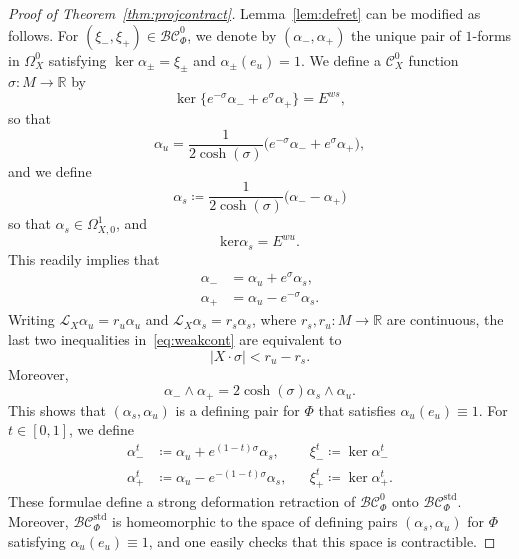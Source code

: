 \documentclass[letterpaper, 11pt]{article}
\numberwithin{equation}{section}
\newcommand{\R}{\mathbb{R}}
\begin{document}
\begin{proof}[Proof of Theorem~\ref{thm:projcontract}]
Lemma~\ref{lem:defret} can be modified as follows. For $(\xi_-, \xi_+) \in \mathcal{BC}^0_\Phi$, we denote by $(\alpha_-, \alpha_+)$ the unique pair of $1$-forms in $\Omega^0_X$ satisfying $\ker \alpha_\pm = \xi_\pm$ and $\alpha_\pm(e_u) = 1$. We define a $\mathcal{C}^0_X$ function $\sigma : M \rightarrow \R$ by $$\ker\big\{e^{-\sigma} \alpha_- + e^{\sigma} \alpha_+ \big\} = E^{ws},$$  so that $$\alpha_u = \frac{1}{2 \cosh(\sigma)}\big( e^{-\sigma} \alpha_- + e^{\sigma} \alpha_+\big),$$ and we define $$\alpha_s \coloneqq \frac{1}{2 \cosh(\sigma)} \big(\alpha_- - \alpha_+ \big)$$ so that $\alpha_s \in \Omega^1_{X,0}$, and $$\mathrm{ker} \alpha_s = E^{wu}.$$ This readily implies that 
\begin{align*}
\alpha_- &= \alpha_u + e^{\sigma} \alpha_s, \\
\alpha_+ &= \alpha_u - e^{-\sigma} \alpha_s.
\end{align*}
Writing $\mathcal{L}_X \alpha_u = r_u \alpha_u$ and $\mathcal{L}_X \alpha_s = r_s \alpha_s$, where $r_s, r_u : M \rightarrow \R$ are continuous, the last two inequalities in~\eqref{eq:weakcont} are equivalent to $$\vert X \cdot \sigma \vert < r_u - r_s.$$ Moreover, $$\alpha_- \wedge \alpha_+ = 2 \cosh(\sigma) \alpha_s \wedge \alpha_u.$$ This shows that $(\alpha_s, \alpha_u)$ is a defining pair for $\Phi$ that satisfies $\alpha_u(e_u) \equiv 1$. For $t \in [0,1]$, we define
\begin{align*}
\alpha^t_- &\coloneqq \alpha_u + e^{(1-t) \sigma} \alpha_s, & &\xi^t_- \coloneqq \ker \alpha^t_-\\
\alpha^t_+ &\coloneqq \alpha_u - e^{-(1-t) \sigma} \alpha_s, & & \xi^t_+ \coloneqq \ker \alpha^t_+.
\end{align*}
These formulae define a strong deformation retraction of $\mathcal{BC}^0_\Phi$ onto $\mathcal{BC}^\mathrm{std}_\Phi$. Moreover, $\mathcal{BC}^\mathrm{std}_\Phi$ is homeomorphic to the space of defining pairs $(\alpha_s, \alpha_u)$ for $\Phi$ satisfying $\alpha_u(e_u) \equiv 1$, and one easily checks that this space is contractible.
\end{proof}
\end{document}
